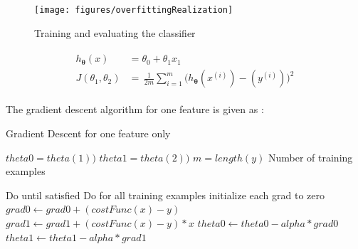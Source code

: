 \begin{landscape}
\begin{figure}
\begin{center}
\texttt{[image: figures/overfittingRealization]}    %
\caption{Training and evaluating the classifier} 
\label{fig:trainingAndEvaluation}
\end{center}
\end{figure}
\end{landscape}

\begin{align}
\label{eqn:linearRegressionTwoFeaturesSummary}
\begin{split}
h_{{\bm{\theta}}}(x) & = \theta_0 + \theta_1 x_1 
\\
J(\theta_1,\theta_2)
 & =\,
\frac{1}{2m} \sum\limits_{i=1}^{m} \Big(h_{\bm{\theta}}(x^{(i)}) - (y^{(i)})\Big)^2  
\end{split}
\end{align}



The gradient descent algorithm for one feature is given as :

 \begin{algorithm}
   \caption{Gradient Descent for one feature only}
    \begin{algorithmic}[1]
      

        \State $theta0 = theta(1))$  
        \State $theta1 = theta(2))$  
        \State $m = length(y)$ \Comment Number of training examples

         \Comment Do until satisfied
                     \Comment Do for all training examples
                         \State initialize each grad to zero
           	 	\State $grad0 \leftarrow grad0 + (costFunc(x) - y)$
		         \State $grad1 \leftarrow grad1 + (costFunc(x) - y) * x$
                    \EndFor
                    \State $theta0 \leftarrow theta0 - alpha * grad0$
                    \State $theta1 \leftarrow theta1 - alpha * grad1$
        \EndFor
       \EndFunction

\end{algorithmic}
\end{algorithm}
 
